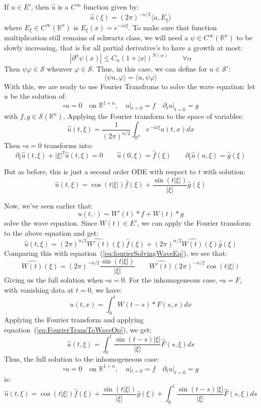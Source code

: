 \documentclass{book}
\newcommand{\R}{{\mathbb{R}}}
\newcommand{\CS}{{\mathcal{S}}}
\renewcommand{\phi}{\varphi}
\begin{document}
If $u \in E'$, then $\hat{u}$ is a $C^\infty$ function given by:
\[
	\hat{u}(\xi) = (2\pi)^{-n/2}\langle u, E_\xi\rangle
\]
where $E_\xi \in C^\infty(\R^n)$ is $E_\xi(x) = e^{-ix \xi}$. To make sure that function multiplication still remains of
schwartz class, we will need a $\psi \in C^\infty(\R^n)$ to be slowly increasing, that is for all partial derivative's
to have a growth at most:
\[
	|\partial^\alpha \psi(x)| \le C_\alpha (1 + |x|)^{N(\alpha)} \qquad \forall \alpha
\]
Then $\psi\phi \in \CS$ whenver $\phi \in \CS$. Thus, in this case, we can define for $u \in \CS'$:
\[
	\langle \psi u, \phi\rangle = \langle u, \psi\phi\rangle
\]
With this, we are ready to use Fourier Transfroms to solve the wave equation: let $u$ be the solution of:
\[
	\square u = 0 \quad\text{on $\R^{1+n}$},\quad u|_{t=0} = f\quad  \partial_t u|_{t=0} = g
\]
with $f,g \in \CS(\R^n)$. Applying the Fourier transform to the space of variables:
\[
	\hat{u}(t, \xi) = \frac{1}{(2\pi)^{n/2}} \int_{\R^n} e^{-ix \xi}u(t,x)dx
\]
Then $\square u = 0$ transforms into:
\[
	\partial_t\hat{u}(t, \xi) + |\xi|^2\hat{u}(t, \xi) = 0 \qquad \hat{u}(0, \xi) = \hat{f}(\xi) \qquad  \partial_t
	\hat{u}(u, \xi) = \hat{g}(\xi)
\]

But as before, this is just a second order ODE with respect to $t$ with solution:
\begin{equation}\label{eq:fourierSolvingWaveEq}
  \hat{u}(t, \xi) = \cos(t|\xi|)\hat{f}(\xi) + \frac{\sin(t|\xi|)}{|\xi|}\hat{g}(\xi)
\end{equation}

Now, we've seen earlier that:
\[
	u(t, \cdot) = W'(t)*f + W(t)*g
\]
solve the wave equation. Since $W(t) \in E'$, we can apply the Fourier transform to the above equation and get:
\[
	\hat{u}(t, \xi) = (2\pi)^{n/2}\widehat{W'(t)}(\xi)\hat{f}(\xi) + (2\pi)^{n/2} \widehat{W(t)}(\xi)\hat{g}(\xi)
\]
Comparing this with equation~(\ref{eq:fourierSolvingWaveEq}), we see that:
\begin{equation}\label{eq:FourierTransToWaveOp}
  \widehat{W(t)}(\xi) = (2\pi)^{-n/2} \frac{\sin(t|\xi|)}{|\xi|} \qquad \widehat{W'(t)} (2\pi)^{-n/2} \cos(t|\xi|)
\end{equation}
Giving us the full solution when $\square u = 0$. For the inhomogeneous case, $\square u = F$, with vanishing data at $t
= 0$, we have:
\[
	u(t,x) = \int_0^t W(t-s)*F(s,x)dx
\]
Applying the Fourier transform and applying equation~(\ref{eq:FourierTransToWaveOp}), we get:
\[
	\hat{u}(t, \xi) = \int_0^t \frac{\sin(t-s)|\xi|}{|\xi|}\hat{F}(s, \xi)ds
\]
Thus, the full solution to the inhomogeneous case:
\[
	\square u = 0 \quad\text{on $\R^{1+n}$},\quad u|_{t=0} = f\quad  \partial_t u|_{t=0} = g
\]
is:
\[
  \hat{u}(t, \xi) = \cos(t|\xi|)\hat{f}(\xi) + \frac{\sin(t|\xi|)}{|\xi|}\hat{g}(\xi) + \int_0^t \frac{\sin(t-s)|\xi|}{|\xi|}\hat{F}(s, \xi)ds
\]
\end{document}
